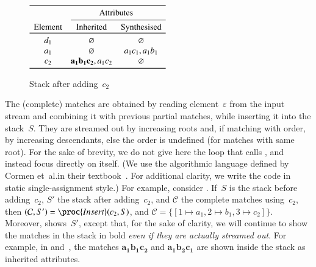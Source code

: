 \begin{figure}
\centering
\(
\begin{array}{ccc}
\toprule
& \multicolumn{2}{c}{\text{Attributes}}\\
\cmidrule(l){2-3}
\text{Element} & \text{Inherited} & \text{Synthesised}\\
\toprule
d_1 & \varnothing & \varnothing\\
a_1 & \varnothing & a_1c_1, a_1b_1\\
c_2 & \mathbf{a_1b_1c_2}, a_1c_2 & \varnothing\\
\bottomrule
\end{array}
\)
\caption{Stack after adding~\(c_2\)}
\label{fig:stack_after_c2}
\end{figure}
The (complete) matches are obtained by reading element~\(\varepsilon\)
from the input stream and combining it with previous partial matches,
while inserting it into the stack~\(S\). They are streamed out by
increasing roots and, if matching with order, by increasing
descendants, else the order is undefined (for matches with same
root). For the sake of brevity, we do not give here the loop that
calls , and instead focus directly on 
itself. (We use the algorithmic language defined by Cormen et~al.\@ in
their textbook~\cite{Cormen:2001}. For additional clarity, we write
the code in static single\hyp{}assignment style.) For example,
consider . If~\(S\) is the stack before
adding~\(c_2\), \(S'\) the stack after adding~\(c_2\), and
\(\mathcal{C}\) the complete matches using~\(c_2\), then \(({\cal
  C}, S') = \proc{Insert}(c_2, S)\), and \(\mathcal{C} = \{[1
  \mapsto a_1, 2 \mapsto b_1, 3 \mapsto c_2]\}\). Moreover,
 shows~\(S'\), except that, for the sake
of clarity, we will continue to show the matches in the stack in bold
\emph{even if they are actually streamed out}. For example, in
 and~, the matches
\(\mathbf{a_1b_1c_2}\) and \(\mathbf{a_1b_2c_1}\) are shown inside the
stack as inherited attributes.
